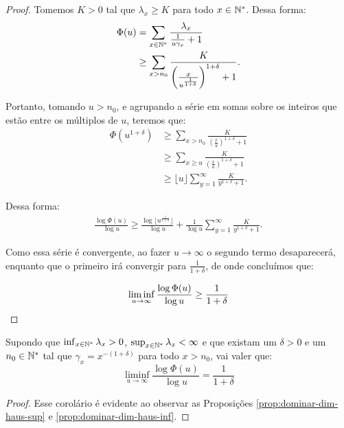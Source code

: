 \begin{proof}
  Tomemos $K > 0$ tal que $\lambda_x \geq K$ para todo $x \in {\mathbb{N^*}}$. Dessa
  forma:
  \begin{align*}
    \Phi(u) &= \sum_{x \in {\mathbb{N^*}}} \frac{\lambda_x}{\frac{1}{u\gamma_x} +
      1}\\
    &\geq \sum_{x > n_0}
    \frac{K}{\left(\frac{x}{u^{\frac{1}{1+\delta}}}\right)^{1+\delta} +1}.
  \end{align*}

  Portanto, tomando $u > n_0$, e agrupando a série em somas sobre os inteiros
  que estão entre os múltiplos de $u$, teremos que:
  \begin{align*}
    \Phi(u^{1+\delta}) 
    &\geq \sum_{x > n_0}
    \frac{K}{\left(\frac{x}{u}\right)^{1+\delta} +1}\\
    &\geq \sum_{x \geq u}
    \frac{K}{\left(\frac{x}{u}\right)^{1+\delta} +1}\\
    &\geq \lfloor u \rfloor \sum_{y = 1}^{\infty}
    \frac{K}{y^{1+\delta} + 1}.
  \end{align*}

  Dessa forma:
  \begin{align*}
    \frac{\log \Phi(u)}{\log u} \geq \frac{\log\lfloor
      u^{\frac{1}{1+\delta}} \rfloor }{\log u} + 
    \frac{1}{\log u} \sum_{y = 1}^{\infty}
    \frac{K}{y^{1+\delta} + 1}.
  \end{align*}

  Como essa série é convergente, ao fazer $u \to \infty$ o segundo
  termo desaparecerá, enquanto que o primeiro irá convergir para
  $\frac{1}{1+\delta}$, de onde concluímos que:

  \begin{displaymath}
    \liminf_{u \to \infty} \frac{\log \Phi (u)}{\log u} \geq
    \frac{1}{1+\delta}
    \qedhere
  \end{displaymath}
\end{proof}

\begin{corolario}
  \label{prop:igualar-dim-haus}
  Supondo que $\inf_{x \in {\mathbb{N^*}}} \lambda_x > 0$, $\sup_{x \in {\mathbb{N^*}}}
  \lambda_x < \infty$ e que existam um $\delta > 0$ e um $n_0 \in {\mathbb{N^*}}$
  tal que $\gamma_x = x^{-(1+\delta)}$ para todo $x > n_0$, vai valer que:
  \begin{displaymath}
    \liminf_{u \to \infty} \frac{\log \Phi(u)}{\log u} = \frac{1}{1+\delta}
  \end{displaymath}
\end{corolario}
\begin{proof}
  Esse corolário é evidente ao observar as Proposições
  \ref{prop:dominar-dim-haus-sup} e \ref{prop:dominar-dim-haus-inf}.
\end{proof}


